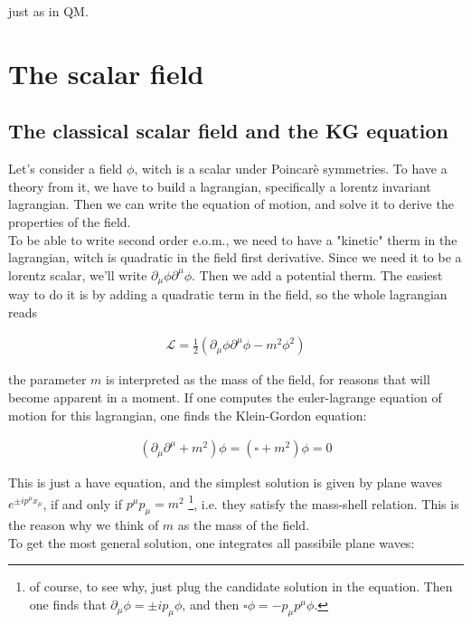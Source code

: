\documentclass{report}
\begin{document}
just as in QM. 


\chapter{The scalar field}

\section{The classical scalar field and the KG equation}

Let's consider a field \(\phi\), witch is a scalar under Poincarè symmetries. To have a theory from it, we have to build a lagrangian, specifically a lorentz invariant lagrangian. Then we can write the equation of motion, and solve it to derive the properties of the field. \\

To be able to write second order e.o.m., we need to have a "kinetic" therm in the lagrangian, witch is quadratic in the field first derivative. Since we need it to be a lorentz scalar, we'll write \(\partial_\mu \phi \partial^\mu \phi\). Then we add a potential therm. The easiest way to do it is by adding a quadratic term in the field, so the whole lagrangian reads

\begin{align}
    \mathcal{L} = \frac{1}{2}(\partial_\mu\phi \partial^\mu\phi -m^2\phi^2)
\end{align}

the parameter \(m\) is interpreted as the mass of the field, for reasons that will become apparent in a moment. If one computes the euler-lagrange equation of motion for this lagrangian, one finds the Klein-Gordon equation: 

\begin{align}
    (\partial_\mu\partial^\mu +m^2)\phi = (\square +m^2)\phi = 0
\end{align}

This is just a have equation, and the simplest solution is given by plane waves \(e^{\pm i p^\mu x_\mu}\), if and only if \(p^\mu p_\mu = m^2\) \footnote{of course, to see why, just plug the candidate solution in the equation. Then one finds that \(\partial_\mu \phi = \pm i p_\mu \phi\), and then \(\square \phi = -p_\mu p^\mu\phi\).}, i.e. they satisfy the mass-shell relation. This is the reason why we think of \(m\) as the mass of the field. \\

To get the most general solution, one integrates all passibile plane waves: 
\end{document}
